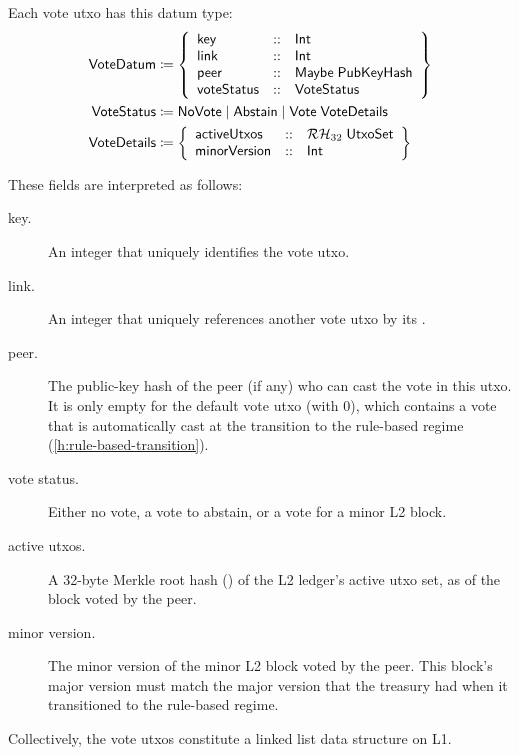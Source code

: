 \documentclass[../hydrozoa.tex]{subfiles}
\begin{document}
Each vote utxo has this datum type:
\begin{equation*}
\begin{split}
  \mathsf{VoteDatum} &\coloneq \left\{
    \begin{array}{lll}
      \mathsf{key}  &::& \mathsf{Int} \\
      \mathsf{link} &::& \mathsf{Int} \\
      \mathsf{peer} &::& \mathsf{Maybe} \; \mathsf{PubKeyHash} \\
      \mathsf{voteStatus} &::& \mathsf{VoteStatus}
    \end{array}\right\}\\
  \mathsf{VoteStatus} &\coloneq \mathsf{NoVote} \mid \mathsf{Abstain} \mid \mathsf{Vote} \; \mathsf{VoteDetails} \\
  \mathsf{VoteDetails} &\coloneq \left\{
    \begin{array}{lll}
      \mathsf{activeUtxos} &::& \mathcal{RH}_{32} \; \mathsf{UtxoSet} \\
      \mathsf{minorVersion} &::& \mathsf{Int}
    \end{array}\right\}
\end{split}
\end{equation*}

These fields are interpreted as follows:
\begin{description}
  \item[key.] An integer that uniquely identifies the vote utxo.
  \item[link.] An integer that uniquely references another vote utxo by its .
  \item[peer.] The public-key hash of the peer (if any) who can cast the vote in this utxo. It is only empty for the default vote utxo (with  0), which contains a vote that is automatically cast at the transition to the rule-based regime (\cref{h:rule-based-transition}).
  \item[vote status.] Either no vote, a vote to abstain, or a vote for a minor L2 block.
  \item[active utxos.] A 32-byte Merkle root hash () of the L2 ledger's active utxo set, as of the block voted by the peer.
  \item[minor version.] The minor version of the minor L2 block voted by the peer. This block's major version must match the major version that the treasury had when it transitioned to the rule-based regime.
\end{description}

Collectively, the vote utxos constitute a linked list data structure on L1.
\end{document}
